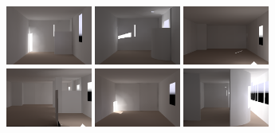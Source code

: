 \documentclass[review]{vgtc}                 %
\begin{document}
\begin{figure}[t]
\includegraphics[width=1.11in]{images/renderings/renovations/050_camera_dark_december_crop.png} %
\includegraphics[width=1.11in]{images/renderings/renovations/050_camera_dark_december_mod_crop.png} \hfill %
\includegraphics[width=1.11in]{images/renderings/renovations/user_046_camera_dark_march_crop.png}    %
\includegraphics[width=1.11in]{images/renderings/renovations/user_046_camera_dark_march_mod_crop.png}  \hfill   %
\includegraphics[width=1.11in]{images/renderings/renovations/042_camera_dark_december_crop.png} %
\includegraphics[width=1.11in]{images/renderings/renovations/042_camera_dark_december_mod_crop.png} %

\vspace{-1.9in}
\begin{minipage}{1.11in}~{\color{white}{\bf N2 original}}\end{minipage} 
\begin{minipage}{1.11in}~{\color{white}{\bf N2 renovation}}\end{minipage}
 \hfill
\begin{minipage}{1.11in}~{\color{white}{\bf N6 original}}\end{minipage} 
\begin{minipage}{1.11in}~{\color{white}{\bf N6 renovation}}\end{minipage} 
\hfill
\begin{minipage}{1.11in}~{\color{white}{\bf A3 original}}\end{minipage} 
\begin{minipage}{1.11in}~{\color{white}{\bf A3 renovation}}\end{minipage}
\vspace{1.7in}


\end{figure}
\end{document}
